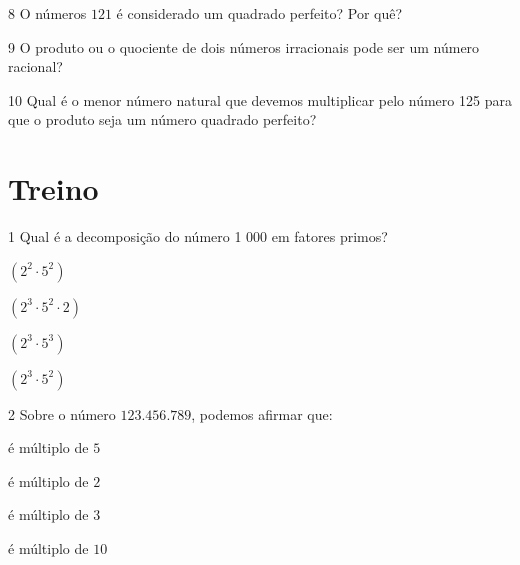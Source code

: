 
\num{8} O números $121$ é considerado um quadrado perfeito? Por quê?


\num{9} O produto ou o quociente de dois números irracionais pode ser um
número racional?





\num{10} Qual é o menor número natural que devemos multiplicar pelo número
125 para que o produto seja um número quadrado perfeito?


\section{Treino}

\num{1} Qual é a decomposição do número 1 000 em fatores primos?

\begin{escolha}
\item $(2^2\cdot 5^2)$
\item $(2^3 \cdot 5^2 \cdot 2)$
\item $(2^3 \cdot 5^3)$
\item $(2^3 \cdot 5^2)$
\end{escolha}









\num{2} Sobre o número $123.456.789$, podemos afirmar que:

\begin{escolha}
\item é múltiplo de $5$
\item é múltiplo de $2$
\item é múltiplo de $3$
\item é múltiplo de $10$
\end{escolha}


